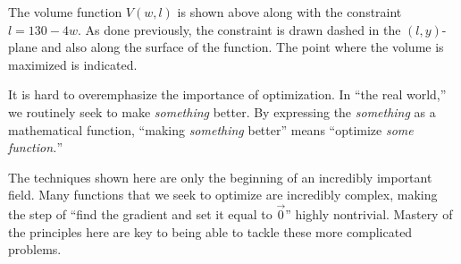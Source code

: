 \documentclass{ximera}
\begin{document}
\begin{example}
\begin{explanation}
    \begin{image}
    \end{image}
    The volume function $V(w,l)$ is shown above
    along with the constraint $l = 130-4w$. As done previously, the
    constraint is drawn dashed in the $(l,y)$-plane and also along the
    surface of the function. The point where the volume is maximized
    is indicated.
  \end{explanation}
\end{example}
      
It is hard to overemphasize the importance of optimization. In ``the
real world,'' we routinely seek to make \textit{something} better. By
expressing the \textit{something} as a mathematical function, ``making
\textit{something} better'' means ``optimize \textit{some function.}''
      
The techniques shown here are only the beginning of an incredibly
important field. Many functions that we seek to optimize are
incredibly complex, making the step of ``find the gradient and set it
equal to $\vec 0$'' highly nontrivial. Mastery of the principles here
are key to being able to tackle these more complicated problems.
\end{document}

